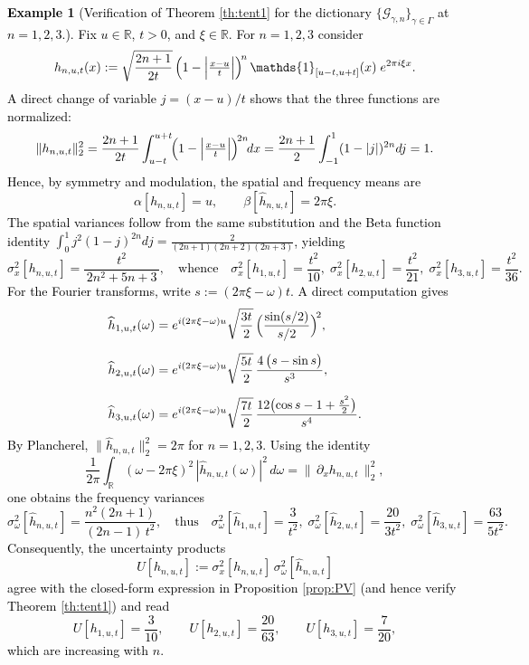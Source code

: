 \documentclass[preprint,hidelinks,authoryear]{elsarticle}
\theoremstyle{plain}
\theoremstyle{definition}
\newtheorem{example}[theorem]{Example}
\theoremstyle{remark}
\begin{document}
\textcolor{black}{
\begin{example}[Verification of Theorem \ref{th:tent1} for the dictionary $\{\mathcal{G}_{\gamma,n}\}_{\gamma\in\Gamma}$ at $n=1,2,3$.]
Fix $u\in\mathbb{R}$, $t>0$, and $\xi\in\mathbb{R}$. For $n=1,2,3$ consider
$$
h_{n,u,t}(x):=\sqrt{\frac{2n+1}{2t}}\,
\Bigl(1-\Bigl|\tfrac{x-u}{t}\Bigr|\Bigr)^{\!n}\,\mathds{1}_{[u-t,u+t]}(x)\; e^{2\pi i \xi x}.
$$
A direct change of variable $j=(x-u)/t$ shows that the three functions are normalized:
$$
\|h_{n,u,t}\|_{2}^{2}
=\frac{2n+1}{2t}\int_{u-t}^{u+t}\!\Bigl(1-\Bigl|\tfrac{x-u}{t}\Bigr|\Bigr)^{\!2n}\!dx
=\frac{2n+1}{2}\int_{-1}^{1}(1-|j|)^{2n}dj=1.
$$
Hence, by symmetry and modulation, the spatial and frequency means are
$$
\alpha[h_{n,u,t}]=u,\qquad \beta[\widehat{h}_{n,u,t}]=2\pi\xi.
$$
The spatial variances follow from the same substitution and the Beta function identity
$\int_{0}^{1} j^{2}(1-j)^{2n}dj=\frac{2}{(2n+1)(2n+2)(2n+3)}$, yielding
$$
\sigma_x^{2}[h_{n,u,t}]
=\frac{t^{2}}{\,2n^{2}+5n+3\,},
\quad\text{whence}\quad
\sigma_x^{2}[h_{1,u,t}]=\frac{t^{2}}{10},\;
\sigma_x^{2}[h_{2,u,t}]=\frac{t^{2}}{21},\;
\sigma_x^{2}[h_{3,u,t}]=\frac{t^{2}}{36}.
$$
For the Fourier transforms, write $s:=(2\pi\xi-\omega)t$. A direct computation gives
\begin{align*}
\widehat{h}_{1,u,t}(\omega)
&=e^{i(2\pi\xi-\omega)u}\sqrt{\frac{3t}{2}}\,
\Bigl(\frac{\sin(s/2)}{s/2}\Bigr)^{\!2},\\[2mm]
\widehat{h}_{2,u,t}(\omega)
&=e^{i(2\pi\xi-\omega)u}\sqrt{\frac{5t}{2}}\,
\frac{4\,\bigl(s-\sin s\bigr)}{s^{3}},\\[2mm]
\widehat{h}_{3,u,t}(\omega)
&=e^{i(2\pi\xi-\omega)u}\sqrt{\frac{7t}{2}}\,
\frac{12\bigl(\cos s-1+\tfrac{s^{2}}{2}\bigr)}{s^{4}}.
\end{align*}
By Plancherel, $\|\widehat{h}_{n,u,t}\|_{2}^{2}=2\pi$ for $n=1,2,3$. Using the identity
$$
\frac{1}{2\pi}\int_{\mathbb{R}}(\omega-2\pi\xi)^{2}\,|\widehat{h}_{n,u,t}(\omega)|^{2}\,d\omega
=\bigl\|\,\partial_x h_{n,u,t}\,\bigr\|_{2}^{2},
$$
one obtains the frequency variances
$$
\sigma_{\omega}^{2}[\widehat{h}_{n,u,t}]
=\frac{n^{2}(2n+1)}{(2n-1)\,t^{2}},
\quad\text{thus}\quad
\sigma_{\omega}^{2}[\widehat{h}_{1,u,t}]=\frac{3}{t^{2}},\;
\sigma_{\omega}^{2}[\widehat{h}_{2,u,t}]=\frac{20}{3t^{2}},\;
\sigma_{\omega}^{2}[\widehat{h}_{3,u,t}]=\frac{63}{5t^{2}}.
$$
Consequently, the uncertainty products
$$
U[h_{n,u,t}]:=\sigma_{x}^{2}[h_{n,u,t}]\,\sigma_{\omega}^{2}[\widehat{h}_{n,u,t}]
$$
agree with the closed-form expression in Proposition \ref{prop:PV} (and hence verify Theorem \ref{th:tent1}) and read
$$
U[h_{1,u,t}]=\frac{3}{10},\qquad
U[h_{2,u,t}]=\frac{20}{63},\qquad
U[h_{3,u,t}]=\frac{7}{20},
$$
which are increasing with $n$.
\end{example}}
\end{document}
